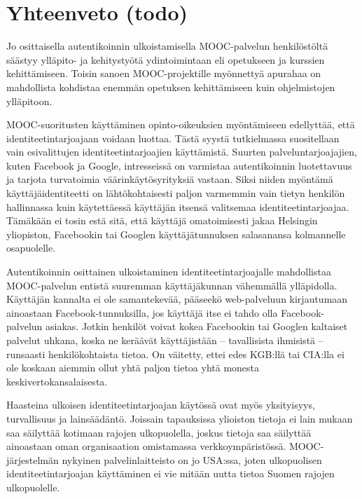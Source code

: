 \documentclass[finnish,gradu]{tktltiki}
\begin{document}



\newpage
\section{Yhteenveto (todo)} %
\label{sec:yhteenveto}

  Jo osittaisella autentikoinnin ulkoistamisella MOOC-palvelun henkilöstöltä säästyy ylläpito- ja kehitystyötä ydintoimintaan eli opetukseen ja kurssien kehittämiseen. Toisin sanoen MOOC-projektille myönnettyä apurahaa on mahdollista kohdistaa enemmän opetuksen kehittämiseen kuin ohjelmistojen ylläpitoon.

  MOOC-suoritusten käyttäminen opinto-oikeuksien myöntämiseen edellyttää, että identiteetintarjoajaan voidaan luottaa. Tästä syystä tutkielmassa suositellaan vain esivalittujen identiteetintarjoajien käyttämistä. Suurten palveluntarjoajajien, kuten Facebook ja Google, intresseissä on varmistaa autentikoinnin luotettavuus ja tarjota turvatoimia väärinkäytösyrityksiä vastaan. Siksi niiden myöntämä käyttäjäidentiteetti on lähtökohtaisesti paljon varmemmin vain tietyn henkilön hallinnassa kuin käytettäessä käyttäjän itsensä valitsemaa identiteetintarjoajaa. Tämäkään ei tosin estä sitä, että käyttäjä omatoimisesti jakaa Helsingin yliopiston, Facebookin tai Googlen käyttäjätunnuksen salasanansa kolmannelle osapuolelle.

  Autentikoinnin osittainen ulkoistaminen identiteetintarjoajalle mahdollistaa MOOC-palvelun entistä suuremman käyttäjäkunnan vähemmällä ylläpidolla. Käyttäjän kannalta ei ole samantekevää, pääseekö web-palveluun kirjautumaan ainoastaan Facebook-tunnuksilla, jos käyttäjä itse ei tahdo olla Facebook-palvelun asiakas. Jotkin henkilöt voivat kokea Facebookin tai Googlen kaltaiset palvelut uhkana, koska ne keräävät käyttäjistään -- tavallisista ihmisistä -- runsaasti henkilökohtaista tietoa. On väitetty, ettei edes KGB:llä tai CIA:lla ei ole koskaan aiemmin ollut yhtä paljon tietoa yhtä monesta keskivertokansalaisesta.

  Haasteina ulkoisen identiteetintarjoajan käytössä ovat myös yksityisyys, turvallisuus ja lainsäädäntö. Joissain tapauksissa ylioiston tietoja ei lain mukaan saa säilyttää kotimaan rajojen ulkopuolella, joskus tietoja saa säilyttää ainoastaan oman organisaation omistamassa verkkoympäristössä. MOOC-järjestelmän nykyinen palvelinlaitteisto on jo USA:ssa, joten ulkopuolisen identiteetintarjoajan käyttäminen ei vie mitään uutta tietoa Suomen rajojen ulkopuolelle.
\end{document}
